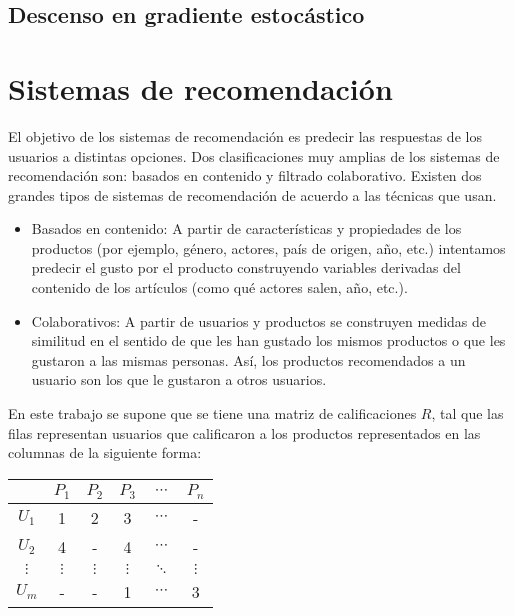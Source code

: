 \subsection{Descenso en gradiente estocástico}

\section{Sistemas de recomendación}

El objetivo de los sistemas de recomendación es predecir las respuestas de los usuarios a distintas opciones. Dos clasificaciones muy amplias de los sistemas de recomendación son: basados en contenido y filtrado colaborativo. Existen dos grandes tipos de sistemas de recomendación de acuerdo a las técnicas que usan.

\begin{itemize}
\item Basados en contenido: A partir de características y propiedades de los productos (por ejemplo, género, actores, país de origen, año, etc.) intentamos predecir el gusto por el producto construyendo variables derivadas del contenido de los artículos (como qué actores salen, año, etc.).
\item Colaborativos: A partir de usuarios y productos se construyen medidas de similitud en el sentido de que les han gustado los mismos productos o que les gustaron a las mismas personas. Así, los productos recomendados a un usuario son los que le gustaron a otros usuarios.
\end{itemize}

En este trabajo se supone que se tiene una matriz de calificaciones $R$, tal que las filas representan usuarios que calificaron a los productos representados en las columnas de la siguiente forma:

\begin{center}
\begin{tabular}{ c | c  c c c c}
    & $P_1$ & $P_2$ & $P_3$ & $\cdots$ & $P_n$ \\
  \hline                       
  $U_1$ &   1 &     2 &     3 & $\cdots$ &      - \\
  $U_2$ &   4 &     - &     4 & $\cdots$  &     -\\
  $\vdots$ & $\vdots$ & $\vdots$ & $\vdots$ & $\ddots$ & $\vdots$\\
  $U_m$ &   - &     - &     1 & $\cdots$ &      3\\
  \hline  
\end{tabular}
\end{center}


